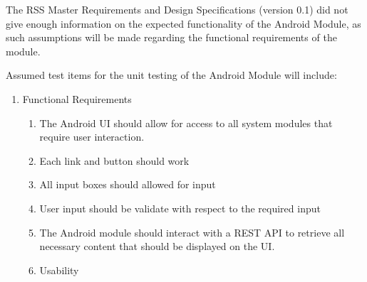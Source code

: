 The RSS Master Requirements and Design Specifications (version 0.1) did not give enough information on the expected functionality of the Android Module, as such assumptions will be made regarding the functional requirements of the module.

Assumed test items for the unit testing of the Android Module will include:
\begin{enumerate}
	\item Functional Requirements
		\begin{enumerate}
			\item The Android UI should allow for access to all system modules that require user interaction.
			
			\item Each link and button should work
			\item All input boxes should allowed for input
			\item User input should be validate with respect to the required input
			\item The Android module should interact with a REST API to retrieve all necessary content that should be displayed on the UI.
			
			\item Usability
			
		\end{enumerate}
	 
\end{enumerate}
